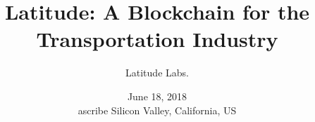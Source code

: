 \documentclass[a4paper]{scrartcl}
\title{\LARGE Latitude: A Blockchain for the Transportation Industry}
\author{
    Latitude Labs.
}
\date{\normalsize June 18, 2018\\ascribe Silicon Valley, California, US}
\begin{document}
\maketitle








\begin{appendices}
\end{appendices}

{\footnotesize{}}

\end{document}
